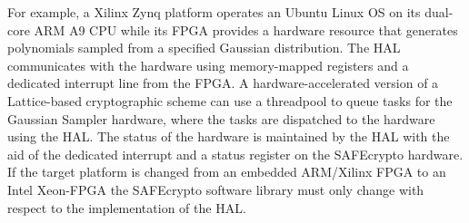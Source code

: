 For example, a Xilinx Zynq platform operates an Ubuntu Linux OS on its dual-core ARM A9 CPU while its FPGA provides a hardware resource that generates polynomials sampled from a specified Gaussian distribution. The HAL communicates with the hardware using memory-mapped registers and a dedicated interrupt line from the FPGA. A hardware-accelerated version of a Lattice-based cryptographic scheme can use a threadpool to queue tasks for the Gaussian Sampler hardware, where the tasks are dispatched to the hardware using the HAL. The status of the hardware is maintained by the HAL with the aid of the dedicated interrupt and a status register on the SAFEcrypto hardware. If the target platform is changed from an embedded ARM/Xilinx FPGA to an Intel Xeon-FPGA the SAFEcrypto software library must only change with respect to the implementation of the HAL.
